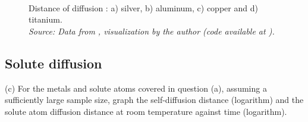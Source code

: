 \begin{figure}[H]
 \centering
 \captionsetup{justification=centering}
   \\
 \caption{Distance of diffusion : a) silver, b) aluminum, c) copper and d) titanium.\\ 
 \textit{Source: Data from \citep{kakusan}, visualization by the author (code available at \citep{mygit}).}}
 \label{fig:selfdiff_lnd}
\end{figure}


\subsection{Solute diffusion}



(c) For the metals and solute atoms covered in question (a), assuming a sufficiently large sample size, graph the self-diffusion distance (logarithm) and the solute atom diffusion distance at room temperature against time (logarithm).
